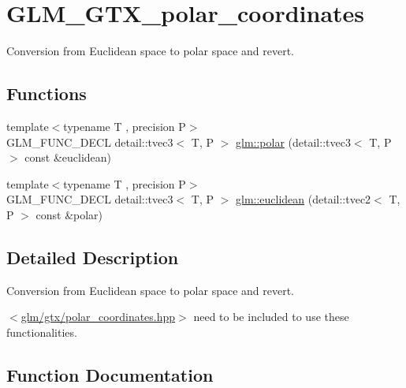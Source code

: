 \hypertarget{group__gtx__polar__coordinates}{}\section{G\+L\+M\+\_\+\+G\+T\+X\+\_\+polar\+\_\+coordinates}
\label{group__gtx__polar__coordinates}


Conversion from Euclidean space to polar space and revert.  


\subsection*{Functions}
\begin{DoxyCompactItemize}
\item 
{\footnotesize template$<$typename T , precision P$>$ }\\G\+L\+M\+\_\+\+F\+U\+N\+C\+\_\+\+D\+E\+CL detail\+::tvec3$<$ T, P $>$ \hyperlink{group__gtx__polar__coordinates_ga7d0a4068875efec56e5d2c6451b5bde2}{glm\+::polar} (detail\+::tvec3$<$ T, P $>$ const \&euclidean)
\item 
{\footnotesize template$<$typename T , precision P$>$ }\\G\+L\+M\+\_\+\+F\+U\+N\+C\+\_\+\+D\+E\+CL detail\+::tvec3$<$ T, P $>$ \hyperlink{group__gtx__polar__coordinates_ga221eaf671619626425e9fb5cb69400b0}{glm\+::euclidean} (detail\+::tvec2$<$ T, P $>$ const \&polar)
\end{DoxyCompactItemize}


\subsection{Detailed Description}
Conversion from Euclidean space to polar space and revert. 

$<$\hyperlink{polar__coordinates_8hpp}{glm/gtx/polar\+\_\+coordinates.\+hpp}$>$ need to be included to use these functionalities. 

\subsection{Function Documentation}
